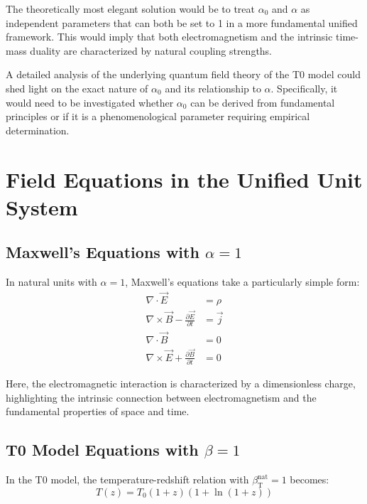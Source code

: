 ﻿\documentclass[12pt,a4paper]{article}
\newcommand{\betaT}{\beta_{\text{T}}}
\begin{document}
	The theoretically most elegant solution would be to treat \(\alpha_0\) and \(\alpha\) as independent parameters that can both be set to 1 in a more fundamental unified framework. This would imply that both electromagnetism and the intrinsic time-mass duality are characterized by natural coupling strengths.
	
	A detailed analysis of the underlying quantum field theory of the T0 model could shed light on the exact nature of \(\alpha_0\) and its relationship to \(\alpha\). Specifically, it would need to be investigated whether \(\alpha_0\) can be derived from fundamental principles or if it is a phenomenological parameter requiring empirical determination.
	
	\section{Field Equations in the Unified Unit System}
	
	\subsection{Maxwell's Equations with \(\alpha = 1\)}
	
	In natural units with \(\alpha = 1\), Maxwell's equations take a particularly simple form:
	\begin{align}
		\nabla \cdot \vec{E} &= \rho \\
		\nabla \times \vec{B} - \frac{\partial \vec{E}}{\partial t} &= \vec{j} \\
		\nabla \cdot \vec{B} &= 0 \\
		\nabla \times \vec{E} + \frac{\partial \vec{B}}{\partial t} &= 0
	\end{align}
	
	Here, the electromagnetic interaction is characterized by a dimensionless charge, highlighting the intrinsic connection between electromagnetism and the fundamental properties of space and time.
	
	\subsection{T0 Model Equations with \(\beta = 1\)}
	
	In the T0 model, the temperature-redshift relation with \(\betaT^{\text{nat}} = 1\) becomes:
	\begin{equation}
		T(z) = T_0 (1+z)(1+\ln(1+z))
	\end{equation}
	
\end{document}
